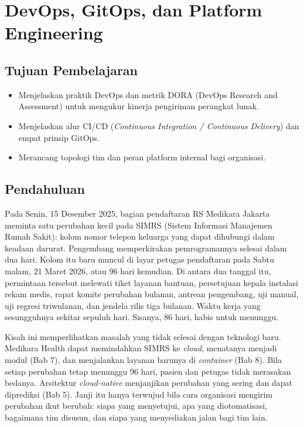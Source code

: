 \chapter{DevOps, GitOps, dan Platform Engineering}
\label{ch:ch13}

\section*{Tujuan Pembelajaran}
\begin{itemize}
  \item Menjelaskan praktik DevOps dan metrik DORA (DevOps Research and Assessment) untuk mengukur
        kinerja pengiriman perangkat lunak.
  \item Menjelaskan alur CI/CD (\textit{Continuous Integration / Continuous Delivery}) dan empat
        prinsip GitOps.
  \item Merancang topologi tim dan peran platform internal bagi organisasi.
\end{itemize}

\section{Pendahuluan}
\label{sec:ch13-pendahuluan}

Pada Senin, 15 Desember 2025, bagian pendaftaran RS Medikara Jakarta meminta satu perubahan kecil
pada SIMRS (Sistem Informasi Manajemen Rumah Sakit): kolom nomor telepon keluarga yang dapat
dihubungi dalam keadaan darurat. Pengembang memperkirakan pemrogramannya selesai dalam dua hari.
Kolom itu baru muncul di layar petugas pendaftaran pada Sabtu malam, 21 Maret 2026, atau 96 hari
kemudian. Di antara dua tanggal itu, permintaan tersebut melewati tiket layanan bantuan,
persetujuan kepala instalasi rekam medis, rapat komite perubahan bulanan, antrean pengembang, uji
manual, uji regresi triwulanan, dan jendela rilis tiga bulanan. Waktu kerja yang sesungguhnya
sekitar sepuluh hari. Sisanya, 86 hari, habis untuk menunggu.

Kisah ini memperlihatkan masalah yang tidak selesai dengan teknologi baru. Medikara Health dapat
memindahkan SIMRS ke \textit{cloud}, menatanya menjadi modul (Bab 7), dan menjalankan layanan barunya di
\textit{container} (Bab 8). Bila setiap perubahan tetap menunggu 96 hari, pasien dan petugas tidak
merasakan bedanya. Arsitektur \textit{cloud-native} menjanjikan perubahan yang sering dan dapat
diprediksi (Bab 5). Janji itu hanya terwujud bila cara organisasi mengirim perubahan ikut berubah:
siapa yang menyetujui, apa yang diotomatisasi, bagaimana tim disusun, dan siapa yang menyediakan
jalan bagi tim lain.

